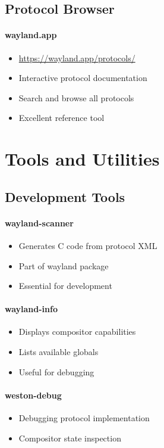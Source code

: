 \subsection{Protocol Browser}

\paragraph{wayland.app}
\begin{itemize}
    \item \url{https://wayland.app/protocols/}
    \item Interactive protocol documentation
    \item Search and browse all protocols
    \item Excellent reference tool
\end{itemize}

\section{Tools and Utilities}

\subsection{Development Tools}

\paragraph{wayland-scanner}
\begin{itemize}
    \item Generates C code from protocol XML
    \item Part of wayland package
    \item Essential for development
\end{itemize}

\paragraph{wayland-info}
\begin{itemize}
    \item Displays compositor capabilities
    \item Lists available globals
    \item Useful for debugging
\end{itemize}

\paragraph{weston-debug}
\begin{itemize}
    \item Debugging protocol implementation
    \item Compositor state inspection
\end{itemize}

